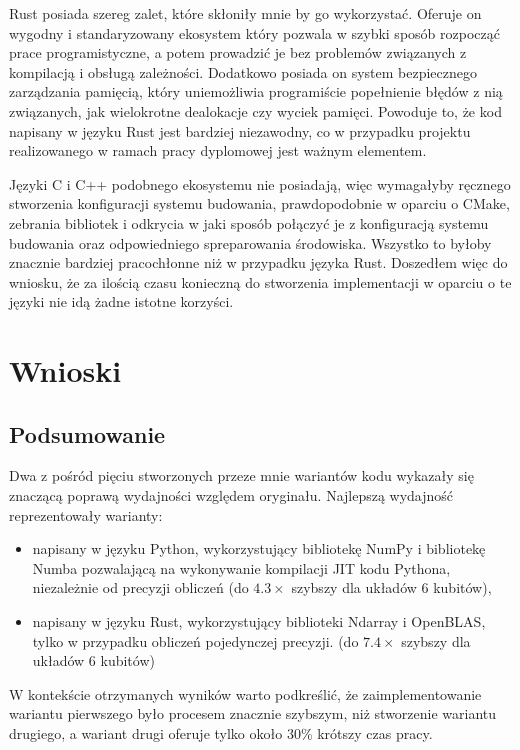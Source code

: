 \documentclass[11pt, a4paper]{article}
\begin{document}
\begin{sloppypar}
    Rust posiada szereg zalet, które skłoniły mnie by go wykorzystać. Oferuje on wygodny
    i standaryzowany ekosystem który pozwala w szybki sposób rozpocząć prace
    programistyczne, a potem prowadzić je bez problemów związanych z kompilacją i obsługą
    zależności. Dodatkowo posiada on system bezpiecznego zarządzania pamięcią, który uniemożliwia
    programiście popełnienie błędów z nią związanych, jak wielokrotne dealokacje czy
    wyciek pamięci. Powoduje to, że kod napisany w języku Rust jest bardziej niezawodny,
    co w przypadku projektu realizowanego w ramach pracy dyplomowej jest ważnym elementem.

    Języki C i C++ podobnego ekosystemu nie posiadają, więc wymagałyby ręcznego
    stworzenia konfiguracji systemu budowania, prawdopodobnie w oparciu o CMake,
    zebrania bibliotek i odkrycia w jaki sposób połączyć je z konfiguracją systemu
    budowania oraz odpowiedniego spreparowania środowiska. Wszystko to byłoby znacznie bardziej
    pracochłonne niż w przypadku języka Rust. Doszedłem więc do wniosku, że za ilością czasu
    konieczną do stworzenia implementacji w oparciu o te języki nie idą żadne istotne korzyści.

    \section{Wnioski}
    \subsection{Podsumowanie}
    Dwa z pośród pięciu stworzonych przeze mnie wariantów kodu wykazały się znaczącą poprawą
    wydajności względem oryginału. Najlepszą wydajność reprezentowały warianty:
    \begin{itemize}
      \item napisany w języku Python, wykorzystujący bibliotekę NumPy i bibliotekę Numba
        pozwalającą na wykonywanie kompilacji JIT kodu Pythona, niezależnie od precyzji obliczeń
        (do $4.3\times$ szybszy dla układów 6 kubitów),

      \item napisany w języku Rust, wykorzystujący biblioteki Ndarray i OpenBLAS, tylko w
        przypadku obliczeń pojedynczej precyzji. (do $7.4\times$ szybszy dla układów 6 kubitów)
    \end{itemize}
    W kontekście otrzymanych wyników warto podkreślić, że zaimplementowanie wariantu pierwszego
    było procesem znacznie szybszym, niż stworzenie wariantu drugiego, a wariant drugi oferuje
    tylko około 30\% krótszy czas pracy.


\end{sloppypar}
\end{document}
